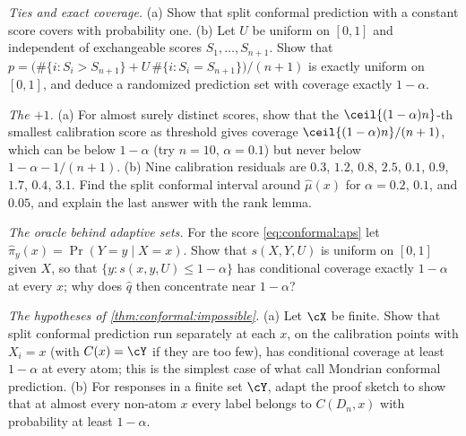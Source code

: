 \begin{refsection}[chapters/14-conformal.bib]
\begin{exercises}
\item \consolidation\hard \emph{Ties and exact coverage.} (a) Show that split conformal prediction with a constant score covers with probability one. (b) Let $U$ be uniform on $[0,1]$ and independent of exchangeable scores $S_1,\dots,S_{n+1}$. Show that $p=\bigl(\#\{i : S_i>S_{n+1}\}+U\,\#\{i : S_i=S_{n+1}\}\bigr)/(n+1)$ is exactly uniform on $[0,1]$, and deduce a randomized prediction set with coverage exactly $1-\alpha$. \label{ex:conformal:ties}

\item \consolidation \emph{The $+1$.} (a) For almost surely distinct scores, show that the $\ceil{(1-\alpha)n}$-th smallest calibration score as threshold gives coverage $\ceil{(1-\alpha)n}/(n+1)$, which can be below $1-\alpha$ (try $n=10$, $\alpha=0.1$) but never below $1-\alpha-1/(n+1)$. (b) Nine calibration residuals are $0.3$, $1.2$, $0.8$, $2.5$, $0.1$, $0.9$, $1.7$, $0.4$, $3.1$. Find the split conformal interval around $\widehat\mu(x)$ for $\alpha=0.2$, $0.1$, and $0.05$, and explain the last answer with the rank lemma.\label{ex:conformal:plusone}

\item \consolidation\hard \emph{The oracle behind adaptive sets.} For the score \eqref{eq:conformal:aps} let $\widehat\pi_y(x)=\Pr(Y=y\mid X=x)$. Show that $s(X,Y,U)$ is uniform on $[0,1]$ given $X$, so that $\{y : s(x,y,U)\le1-\alpha\}$ has conditional coverage exactly $1-\alpha$ at every $x$; why does $\widehat q$ then concentrate near $1-\alpha$? \label{ex:conformal:aps}

\item \consolidation \emph{The hypotheses of \cref{thm:conformal:impossible}.} (a) Let $\cX$ be finite. Show that split conformal prediction run separately at each $x$, on the calibration points with $X_i=x$ (with $C(x)=\cY$ if they are too few), has conditional coverage at least $1-\alpha$ at every atom; this is the simplest case of what \textcite{Vovk2005} call Mondrian conformal prediction. (b) For responses in a finite set $\cY$, adapt the proof sketch to show that at almost every non-atom $x$ every label belongs to $C(D_n,x)$ with probability at least $1-\alpha$.\label{ex:conformal:atoms}


\end{exercises}
\end{refsection}
